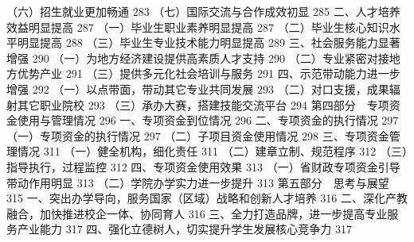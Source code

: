 （六）招生就业更加畅通	283
（七）国际交流与合作成效初显	285
二、人才培养效益明显提高	287
（一）毕业生职业素养明显提高	287
（二）毕业生核心知识水平明显提高	288
（三）毕业生专业技术能力明显提高	289
三、社会服务能力显著增强	290
（一）为地方经济建设提供高素质人才支持	290
（二）专业紧密对接地方优势产业	291
（三）提供多元化社会培训与服务	291
四、示范带动能力进一步增强	292
（一）以点带面，带动其它专业共同发展	293
（二）对口支援，成果辐射其它职业院校	293
（三）承办大赛，搭建技能交流平台	294
第四部分　专项资金使用与管理情况	296
一、专项资金到位情况	296
二、专项资金的执行情况	297
（一）专项资金的执行情况	297
（二）子项目资金使用情况	298
三、专项资金管理情况	311
（一）健全机构，细化责任	311
（二）建章立制、规范程序	312
（三）指导执行，过程监控	312
四、专项资金使用效果	313
（一）省财政专项资金引导带动作用明显	313
（二）学院办学实力进一步提升	313
第五部分　思考与展望	315
一、突出办学导向，服务国家（区域）战略和创新人才培养	316
二、深化产教融合，加快推进校企一体、协同育人	316
三、全力打造品牌，进一步提高专业服务产业能力	317
四、强化立德树人，切实提升学生发展核心竞争力	317

